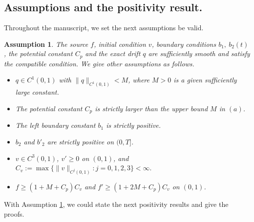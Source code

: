 \documentclass[11pt]{article}
\newtheorem{assumption}{Assumption}
\numberwithin{equation}{section}
\begin{document}
\subsection{Assumptions and the positivity result. }
Throughout the manuscript, we set the next assumptions be valid.
\begin{assumption}\label{assumption} 
The source $f$, initial condition $v$, boundary conditions $b_1,\ b_2(t)$, the potential constant $C_p$ and the exact drift $q$ are sufficiently smooth and satisfy the compatible condition. We give other assumptions as follows.  
 \begin{itemize}
 \item [(a)] $q\in C^1(0,1)$ with $\|q\|_{C^1(0,1)}<M$, where $M>0$ is a given sufficiently large constant.  
  \item [(b)] The potential constant $C_p$ is strictly larger than the upper bound $M$ in $(a)$. 
  \item [(c)] The left boundary constant $b_1$ is strictly positive. 
  \item [(d)] $b_2$ and $b'_2$ are strictly positive on $(0,T]$.   
  \item [(e)] $v\in C^3(0,1)$, $v'\ge 0$ on $(0,1)$, and $C_v:=\max\{\|v\|_{C^j(0,1)}:j=0,1,2,3\}<\infty.$
  \item [(f)] $f\ge (1+M+C_p)C_v$ and $f'\ge (1+2M+C_p)C_v$ on $(0,1)$.
 \end{itemize}
\end{assumption}

With Assumption \ref{assumption}, we could state the next positivity results and give the proofs. 
\end{document}
